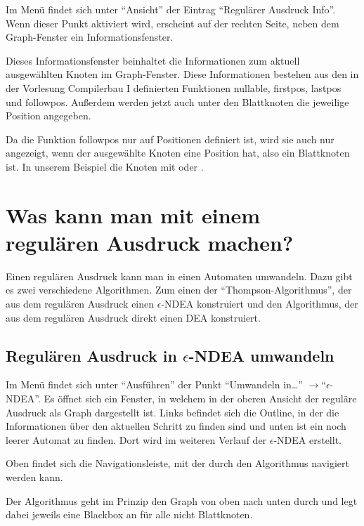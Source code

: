 Im Menü findet sich unter "`Ansicht"' der Eintrag "`Regulärer Ausdruck Info"'. Wenn dieser Punkt aktiviert wird, erscheint auf der rechten Seite, neben dem Graph-Fenster ein Informationsfenster.

Dieses Informationsfenster beinhaltet die Informationen zum aktuell ausgewählten Knoten im Graph-Fenster. Diese Informationen bestehen aus den in der Vorlesung Compilerbau I definierten Funktionen nullable, firstpos, lastpos und followpos. Außerdem werden jetzt auch unter den Blattknoten die jeweilige Position angegeben.

Da die Funktion followpos nur auf Positionen definiert ist, wird sie auch nur angezeigt, wenn der ausgewählte Knoten eine Position hat, also ein Blattknoten ist. In unserem Beispiel die Knoten mit  oder .

\section{Was kann man mit einem regulären Ausdruck machen?}

Einen regulären Ausdruck kann man in einen Automaten umwandeln. Dazu gibt es zwei verschiedene Algorithmen. Zum einen der "`Thompson-Algorithmus"', der aus dem regulären Ausdruck einen $\epsilon$-NDEA konstruiert und den Algorithmus, der aus dem regulären Ausdruck direkt einen DEA konstruiert.

\subsection{Regulären Ausdruck in $\epsilon$-NDEA umwandeln}

Im Menü findet sich unter "`Ausführen"' der Punkt "`Umwandeln in\ldots"' $\rightarrow$"`$\epsilon$-NDEA"'. Es öffnet sich ein Fenster, in welchem in der oberen Ansicht der reguläre Ausdruck als Graph dargestellt ist. Links befindet sich die Outline, in der die Informationen über den aktuellen Schritt zu finden sind und unten ist ein noch leerer Automat zu finden. Dort wird im weiteren Verlauf der $\epsilon$-NDEA erstellt.

Oben findet sich die Navigationsleiste, mit der durch den Algorithmus navigiert werden kann.

Der Algorithmus geht im Prinzip den Graph von oben nach unten durch und legt dabei jeweils eine Blackbox an für alle nicht Blattknoten. 

